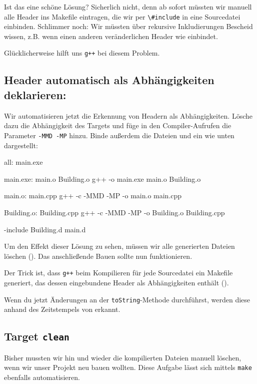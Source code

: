 Ist das eine schöne Lösung?
Sicherlich nicht, denn ab sofort müssten wir manuell alle Header ins Makefile eintragen, die wir per \lstinline{\#include} in eine Sourcedatei einbinden.
Schlimmer noch: Wir müssten über rekursive Inkludierungen Bescheid wissen, z.B. wenn  einen anderen veränderlichen Header wie  einbindet.

Glücklicherweise hilft uns \texttt{g++} bei diesem Problem.

\subsection{Header automatisch als Abhängigkeiten deklarieren:}

Wir automatisieren jetzt die Erkennung von Headern als Abhängigkeiten.
Lösche dazu die Abhängigkeit  des Targets  und füge in den Compiler-Aufrufen die Parameter \texttt{-MMD -MP} hinzu.
Binde außerdem die Dateien  und  ein wie unten dargestellt:
\begin{lstmake}
all: main.exe

main.exe: main.o Building.o
    g++ -o main.exe main.o Building.o

main.o: main.cpp
    g++ -c -MMD -MP -o main.o main.cpp

Building.o: Building.cpp
    g++ -c -MMD -MP -o Building.o Building.cpp

-include Building.d main.d
\end{lstmake}

Um den Effekt dieser Lösung zu sehen, müssen wir alle generierten Dateien löschen ().
Das anschließende Bauen sollte nun funktionieren.

Der Trick ist, dass \texttt{g++} beim Kompilieren für jede Sourcedatei ein Makefile generiert, das dessen eingebundene Header als Abhängigkeiten enthält ().

Wenn du jetzt Änderungen an der \lstinline{toString}-Methode durchführst, werden diese anhand des Zeitstempels von  erkannt.

\subsection{Target \lstinline{clean}}

Bisher mussten wir hin und wieder die kompilierten Dateien manuell löschen, wenn wir unser Projekt neu bauen wollten.
Diese Aufgabe lässt sich mittels \texttt{make} ebenfalls automatisieren.

